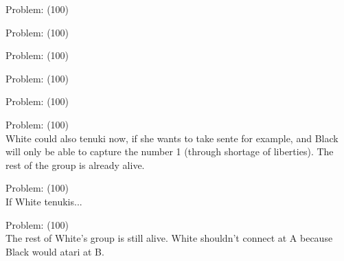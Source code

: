 \documentclass[11pt]{article}
\begin{document}
\begin{minipage}[t]{0.5\textwidth}
  {\centering
  
Problem: (100)\\
  }
\end{minipage}
\begin{minipage}[t]{0.5\textwidth}
  {\centering
  
Problem: (100)\\
  }
\end{minipage}
\begin{minipage}[t]{0.5\textwidth}
  {\centering
  
Problem: (100)\\
  }
\end{minipage}
\begin{minipage}[t]{0.5\textwidth}
  {\centering
  
Problem: (100)\\
  }
\end{minipage}
\begin{minipage}[t]{0.5\textwidth}
  {\centering
  
Problem: (100)\\
  }
\end{minipage}
\begin{minipage}[t]{0.5\textwidth}
  {\centering
  
Problem: (100)\\
White could also tenuki now, if she wants to take sente for example, and Black will only be able to capture the number 1 (through shortage of liberties). The rest of the group is already alive.\\
  }
\end{minipage}
\begin{minipage}[t]{0.5\textwidth}
  {\centering
  
Problem: (100)\\
If White tenukis...\\
  }
\end{minipage}
\begin{minipage}[t]{0.5\textwidth}
  {\centering
  
Problem: (100)\\
The rest of White's group is still alive. White shouldn't connect at A because Black would atari at B.\\
  }
\end{minipage}
\end{document}
